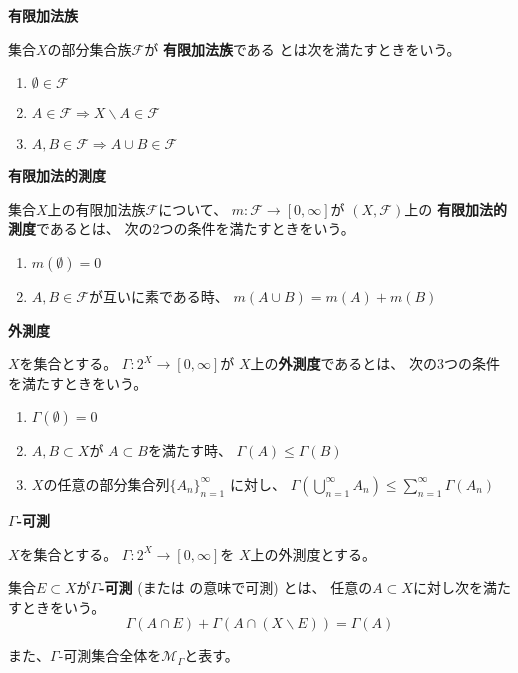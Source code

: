 \documentclass[12pt,b5paper]{ltjsarticle}
\begin{document}
\hrulefill

\textbf{有限加法族}

集合$X$の部分集合族$\mathcal{F}$が
\textbf{有限加法族}である
とは次を満たすときをいう。
\begin{enumerate}
 \item $\emptyset \in \mathcal{F}$
 \item $A \in \mathcal{F} \Rightarrow X\backslash A \in\mathcal{F}$
 \item $A,B\in\mathcal{F}
       \Rightarrow A\cup B \in\mathcal{F}$
\end{enumerate}


\textbf{有限加法的測度}

集合$X$上の有限加法族$\mathcal{F}$について、
$m:\mathcal{F}\to [0,\infty]$が
$(X,\mathcal{F})$上の
\textbf{有限加法的測度}であるとは、
次の2つの条件を満たすときをいう。
\begin{enumerate}
 \item $m(\emptyset) =0$
 \item $A,B\in\mathcal{F}$が互いに素である時、
       $m(A\cup B) = m(A) + m(B)$
\end{enumerate}


\textbf{外測度}

$X$を集合とする。
$\Gamma : 2^{X}\to [0,\infty]$が
$X$上の\textbf{外測度}であるとは、
次の3つの条件を満たすときをいう。
\begin{enumerate}
 \item
      $\Gamma (\emptyset) = 0$
 \item
      $A,B \subset X$が
      $A\subset B$を満たす時、
      $\Gamma(A)\leq \Gamma(B)$
 \item
      $X$の任意の部分集合列$\{A_{n}\}_{n=1}^{\infty}$
      に対し、
      $\Gamma(\bigcup_{n=1}^{\infty}A_{n}) \leq \sum_{n=1}^{\infty}\Gamma(A_{n})$
\end{enumerate}



\textbf{$\Gamma$-可測}

$X$を集合とする。
$\Gamma : 2^{X}\to [0,\infty]$を
$X$上の外測度とする。

集合$E\subset X$が\textbf{$\Gamma$-可測}
(または の意味で可測)
とは、
任意の$A\subset X$に対し次を満たすときをいう。
\begin{equation}
 \Gamma(A\cap E) + \Gamma(A\cap (X\backslash E)) = \Gamma(A)
\end{equation}

また、$\Gamma$-可測集合全体を$\mathcal{M}_{\Gamma}$と表す。
\end{document}
